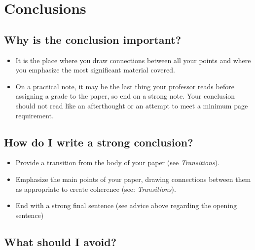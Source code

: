 


\chapter{Conclusions} 
\section{Why is the conclusion important?}

\begin{itemize}
\item It is the place where you draw connections between all your points and where 
you emphasize the most significant material covered.
 
\item On a practical note, it may be the last thing your professor reads before assigning 
a grade to the paper, so end on a strong note. Your conclusion should not read like an 
afterthought or an attempt to meet a minimum page requirement. 
\end{itemize}

\section{How do I write a strong conclusion?}
        	
\begin{itemize}

\item Provide a transition from the body of your paper (see \emph{Transitions}).
 
\item Emphasize the main points of your paper, drawing connections between them as 
appropriate to create coherence (see: \emph{Transitions}).
 
\item End with a strong final sentence (see advice above regarding the opening 
sentence)

\end{itemize}

\section{What should I avoid?}

